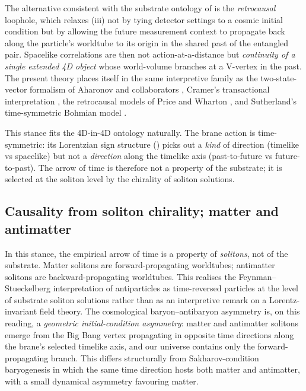 The alternative consistent with the substrate ontology of  is the \emph{retrocausal} loophole, which relaxes (iii) not by tying detector settings to a cosmic initial condition but by allowing the future measurement context to propagate back along the particle's worldtube to its origin in the shared past of the entangled pair.
Spacelike correlations are then not action-at-a-distance but \emph{continuity of a single extended 4D object} whose world-volume branches at a V-vertex in the past.
The present theory places itself in the same interpretive family as the two-state-vector formalism of Aharonov and collaborators \citep{AharonovBergmannLebowitz1964,Aharonov2008TSVF}, Cramer's transactional interpretation \citep{Cramer1986TI}, the retrocausal models of Price and Wharton \citep{PriceWharton2015Retrocausality}, and Sutherland's time-symmetric Bohmian model \citep{Sutherland2017}.

This stance fits the 4D-in-4D ontology naturally.
The brane action is time-symmetric: its Lorentzian sign structure () picks out a \emph{kind} of direction (timelike vs spacelike) but not a \emph{direction} along the timelike axis (past-to-future vs future-to-past).
The arrow of time is therefore not a property of the substrate; it is selected at the soliton level by the chirality of soliton solutions.

\subsection{Causality from soliton chirality; matter and antimatter}
\label{subsec:soliton-chirality-bell}

In this stance, the empirical arrow of time is a property of \emph{solitons}, not of the substrate.
Matter solitons are forward-propagating worldtubes; antimatter solitons are backward-propagating worldtubes.
This realises the Feynman--Stueckelberg interpretation of antiparticles as time-reversed particles \citep{Stueckelberg1941,Feynman1949ApproachQED} at the level of substrate soliton solutions rather than as an interpretive remark on a Lorentz-invariant field theory.
The cosmological baryon--antibaryon asymmetry is, on this reading, a \emph{geometric initial-condition asymmetry}: matter and antimatter solitons emerge from the Big Bang vertex propagating in opposite time directions along the brane's selected timelike axis, and our universe contains only the forward-propagating branch.
This differs structurally from Sakharov-condition baryogenesis \citep{Sakharov1967CPviolation} in which the same time direction hosts both matter and antimatter, with a small dynamical asymmetry favouring matter.

